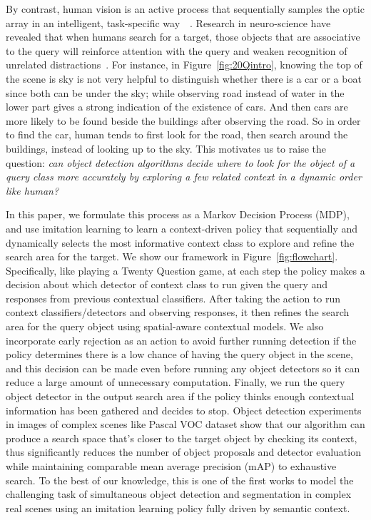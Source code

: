By contrast, human vision is an active process that sequentially samples the optic array in an intelligent, task-specific way~\cite{najemnik2005optimal}~. Research in neuro-science have revealed that when humans search for a target, those objects that are associative to the query will reinforce attention with the query and weaken recognition of unrelated distractions~\cite{moores2003associative}. 
For instance, in Figure~\ref{fig:20Qintro}, knowing the top of the scene is sky is not very helpful to distinguish whether there is a car or a boat since both can be under the sky; 
while observing road instead of water in the lower part gives a strong indication of the existence of cars. And then cars are more likely to be found beside the buildings after observing the road. So in order to find the car, human tends to first look for the road, then search around the buildings, instead of looking up to the sky. %
This motivates us to raise the question: \textit{can object detection algorithms decide where to look for the object of a query class more accurately by exploring a few related context in a dynamic order like human?}

In this paper, we formulate this process as a Markov Decision Process (MDP), and use imitation learning to learn a context-driven policy that sequentially and dynamically selects the most informative context class to explore and refine the search area for the target. We show our framework in Figure~\ref{fig:flowchart}.  Specifically, like playing a Twenty Question game, at each step the policy makes a decision about which detector of context class to run given the query and responses from previous contextual classifiers. After taking the action to run context classifiers/detectors and observing responses, it then refines the search area for the query object using spatial-aware contextual models. We also incorporate early rejection as an action to avoid further running detection if the policy determines there is a low chance of having the query object in the scene, and this decision can be made even before running any object detectors so it can reduce a large amount of unnecessary computation. Finally, we run the query object detector in the output search area if the policy thinks enough contextual information has been gathered and decides to stop. Object detection experiments in images of complex scenes like Pascal VOC dataset show that our algorithm can produce a search space that's closer to the target object by checking its context, thus significantly reduces the number of object proposals and detector evaluation while maintaining comparable mean average precision (mAP) to exhaustive search. To the best of our knowledge, this is one of the first works to model the challenging task of simultaneous object detection and segmentation in complex real scenes using an imitation learning policy fully driven by semantic context.


